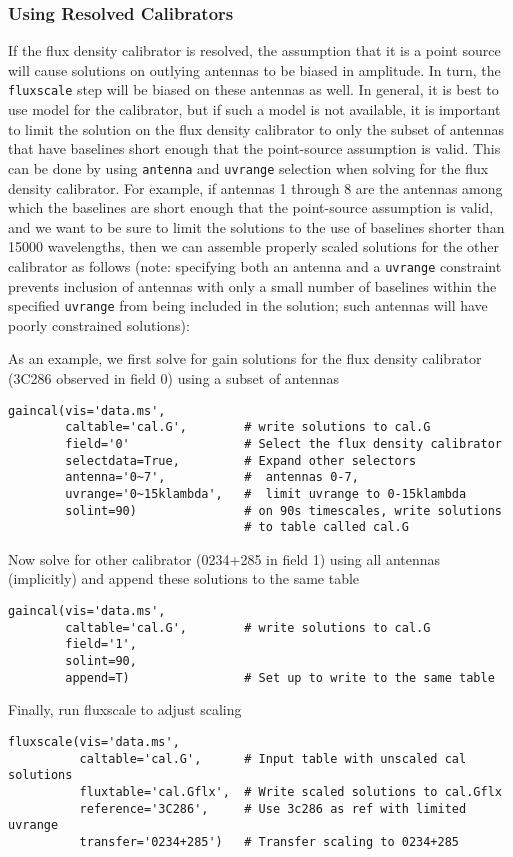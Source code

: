 \subsubsection{Using Resolved Calibrators}
\label{section:cal.solve.fluxscale.resolved}

If the flux density calibrator is resolved, the assumption that it is
a point source will cause solutions on outlying antennas to be biased
in amplitude.  In turn, the {\tt fluxscale} step will be biased
on these antennas as well.  In general, it is best to use 
model for the calibrator, but if such a model is not available,
it is important to limit the solution on the flux density calibrator
to only the subset of antennas that have baselines short enough that
the point-source assumption is valid.  This can be done by using
{\tt antenna} and {\tt uvrange} selection when solving for the flux density
calibrator.  For example, if antennas 1 through 8 are the antennas
among which the baselines are short enough that the point-source
assumption is valid, and we want to be sure to limit the solutions to
the use of baselines shorter than 15000 wavelengths, then we can
assemble properly scaled solutions for the other calibrator as follows
(note: specifying both an antenna and a {\tt uvrange} constraint prevents
inclusion of antennas with only a small number of baselines within the
specified {\tt uvrange} from being included in the solution; such antennas
will have poorly constrained solutions):

As an example, we first solve for gain solutions for the flux density
calibrator (3C286 observed in field 0) using a subset of antennas
\small
\begin{verbatim}
gaincal(vis='data.ms',
        caltable='cal.G',        # write solutions to cal.G
        field='0'                # Select the flux density calibrator
        selectdata=True,         # Expand other selectors
        antenna='0~7',           #  antennas 0-7,
        uvrange='0~15klambda',   #  limit uvrange to 0-15klambda
        solint=90)               # on 90s timescales, write solutions
                                 # to table called cal.G
\end{verbatim}
\normalsize
Now solve for other calibrator (0234+285 in field 1) using all antennas
(implicitly) and append these solutions to the same table
\small
\begin{verbatim}
gaincal(vis='data.ms',
        caltable='cal.G',        # write solutions to cal.G
        field='1',
        solint=90,
        append=T)                # Set up to write to the same table
\end{verbatim}
\normalsize
Finally, run fluxscale to adjust scaling
\small
\begin{verbatim}
fluxscale(vis='data.ms',
          caltable='cal.G',      # Input table with unscaled cal solutions
          fluxtable='cal.Gflx',  # Write scaled solutions to cal.Gflx
          reference='3C286',     # Use 3c286 as ref with limited uvrange
          transfer='0234+285')   # Transfer scaling to 0234+285
\end{verbatim}
\normalsize

